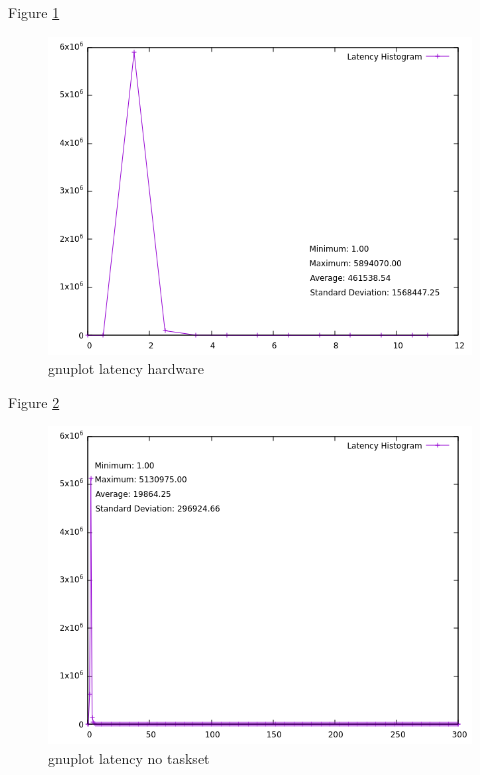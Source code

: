 \documentclass[MMR,Master,english]{twbook}
\begin{document}
   Figure \ref{fig:gnuplot_latency_hardware}
   \begin{figure}[H]
       \centering
       \includegraphics[width=0.8\columnwidth]{masterthesis-documentation/docs/sigmatek/xenomai/hardware/gnuplot_latency_hardware.png}
       \caption[gnuplot latency hardware]{gnuplot latency hardware}
       \label{fig:gnuplot_latency_hardware}
     \end{figure}

     Figure \ref{fig:gnuplot_latency_no_taskset}
     \begin{figure}[H]
         \centering
         \includegraphics[width=0.8\columnwidth]{masterthesis-documentation/docs/sigmatek/xenomai/no_taskset/gnuplot_latency_no_taskset.png}
         \caption[gnuplot latency no taskset]{gnuplot latency no taskset}
         \label{fig:gnuplot_latency_no_taskset}
       \end{figure}
\end{document}
